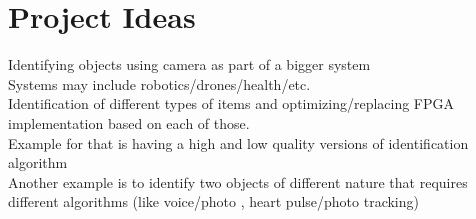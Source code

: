 \documentclass{article}
\begin{document}
\section{Project Ideas}

Identifying objects using camera as part of a bigger system \\
	Systems may include robotics/drones/health/etc. \\
Identification of different types of items and optimizing/replacing FPGA implementation based on each of those. \\
	Example for that is having a high and low quality versions of identification algorithm\\
 	Another example is to identify two objects of different nature that requires different algorithms (like voice/photo , heart pulse/photo tracking)
\end{document}
